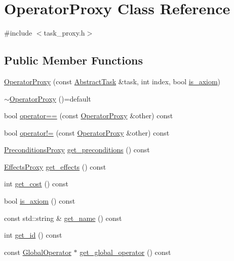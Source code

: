 \hypertarget{classOperatorProxy}{\section{Operator\-Proxy Class Reference}
\label{classOperatorProxy}
}


{\ttfamily \#include $<$task\-\_\-proxy.\-h$>$}

\subsection*{Public Member Functions}
\begin{DoxyCompactItemize}
\item 
\hyperlink{classOperatorProxy_a0ff9212de827c7ceef023c5160128154}{Operator\-Proxy} (const \hyperlink{classAbstractTask}{Abstract\-Task} \&task, int index, bool \hyperlink{classOperatorProxy_a2d573a6ad8530877f1d0467f7874c4b3}{is\-\_\-axiom})
\item 
\hyperlink{classOperatorProxy_a71dfdd6e432a1d944ddfdc509c3f566f}{$\sim$\-Operator\-Proxy} ()=default
\item 
bool \hyperlink{classOperatorProxy_a7697ce5753aecfc7d7c95f765ebf200d}{operator==} (const \hyperlink{classOperatorProxy}{Operator\-Proxy} \&other) const 
\item 
bool \hyperlink{classOperatorProxy_a1fe5933a37afc31978deea862caa5017}{operator!=} (const \hyperlink{classOperatorProxy}{Operator\-Proxy} \&other) const 
\item 
\hyperlink{classPreconditionsProxy}{Preconditions\-Proxy} \hyperlink{classOperatorProxy_aa21eff1459257a6d8db90666bdc738a8}{get\-\_\-preconditions} () const 
\item 
\hyperlink{classEffectsProxy}{Effects\-Proxy} \hyperlink{classOperatorProxy_ad1bcc58e597fcd0af4634afefd944ee6}{get\-\_\-effects} () const 
\item 
int \hyperlink{classOperatorProxy_ab5242f56741a6d13adecce2edae920ef}{get\-\_\-cost} () const 
\item 
bool \hyperlink{classOperatorProxy_a2d573a6ad8530877f1d0467f7874c4b3}{is\-\_\-axiom} () const 
\item 
const std\-::string \& \hyperlink{classOperatorProxy_a37dd91050b8bc99e0d50c0a853d833d1}{get\-\_\-name} () const 
\item 
int \hyperlink{classOperatorProxy_a0685a29a3841ab5e4953cce0003ef0cc}{get\-\_\-id} () const 
\item 
const \hyperlink{classGlobalOperator}{Global\-Operator} $\ast$ \hyperlink{classOperatorProxy_a8460a7a40bb4712cbc67341688900fb7}{get\-\_\-global\-\_\-operator} () const 
\end{DoxyCompactItemize}


